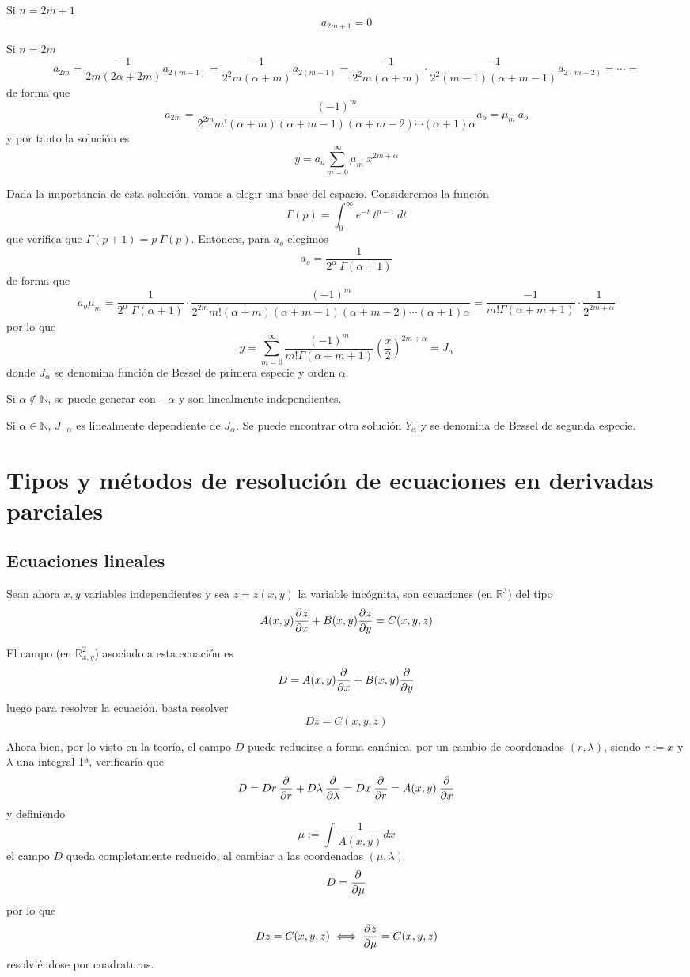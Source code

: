 \begin{eje}
    Si $n=2m+1$
$$a_{2m+1}=0$$
    
    Si $n=2m$
    $$a_{2m}=\dfrac{-1}{2m(2\alpha+2m)}a_{2(m-1)}=\dfrac{-1}{2^2m(\alpha+m)}a_{2(m-1)}=\dfrac{-1}{2^2m(\alpha+m)} \cdot \dfrac{-1}{2^2(m-1)(\alpha+m-1)}a_{2(m-2)}=\cdots=$$
    de forma que 
    $$a_{2m}=\dfrac{(-1)^m}{2^{2m} m! (\alpha+m) (\alpha+m-1) (\alpha+m-2) \cdots (\alpha+1)\alpha}a_o=\mu_m \: a_o$$
    y por tanto la solución es 
    $$\boxed{ \: y=a_o \sum_{m=0}^{\infty} \mu_m \: x^{2m+\alpha} \: }$$

    Dada la importancia de esta solución, vamos a elegir una base del espacio. Consideremos la función 
    $$\Gamma(p)=\int_0^{\infty}e^{-t} \: t^{p-1} \: dt$$
    que verifica que $\Gamma(p+1)=p \: \Gamma(p)$. Entonces, para $a_o$ elegimos
    $$a_o=\dfrac{1}{2^{\alpha} \: \Gamma(\alpha+1)} $$
    de forma que 
    $$a_o\mu_m=\dfrac{1}{2^{\alpha} \: \Gamma(\alpha+1)}  \cdot \dfrac{(-1)^m}{2^{2m} m! (\alpha+m) (\alpha+m-1) (\alpha+m-2) \cdots (\alpha+1)\alpha}=\dfrac{-1}{m! \Gamma(\alpha+m+1)} \cdot \dfrac{1}{2^{2m+\alpha}} $$
    por lo que 
    $$y=\sum_{m=0}^{\infty} \dfrac{(-1)^m}{m! \Gamma(\alpha+m+1)} \left(\dfrac{x}{2}\right)^{2m+\alpha}=J_{\alpha}$$
    donde $J_{\alpha}$ se denomina función de Bessel de primera especie y orden $\alpha$.

    Si $\alpha\nin \mathbb N$, se puede generar con $-\alpha$ y son linealmente independientes. 
    
    Si $\alpha\in \mathbb N$,  $J_{-\alpha}$ es linealmente dependiente de $J_{\alpha}$. Se puede encontrar otra solución $Y_{\alpha}$ y se denomina de Bessel de segunda especie.
\end{eje}
\chapter{Tipos y métodos de resolución de ecuaciones en derivadas parciales}
\section{Ecuaciones lineales}
Sean ahora $x,y$ variables independientes y sea $z=z(x,y)$ la variable incógnita, son ecuaciones (en $\mathbb R^3$) del tipo
$$A(x,y) \frac{\partial^{} z}{\partial x} + B(x,y) \frac{\partial^{} z}{\partial y}=C(x,y,z)$$

El campo (en $\mathbb R^2_{x,y}$) asociado a esta ecuación es 
$$D=A(x,y)\frac{\partial^{} }{\partial x}+B(x,y)\frac{\partial^{} }{\partial y}$$
luego para resolver la ecuación, basta resolver
$$Dz=C(x,y,z)$$

Ahora bien, por lo visto en la teoría, el campo $D$ puede reducirse a forma canónica, por un cambio de coordenadas $(r,\lambda)$, siendo $r:=x$ y $\lambda$ una integral 1ª, verificaría que
$$D=Dr \: \frac{\partial^{} }{\partial r}+ D\lambda \: \frac{\partial^{} }{\partial \lambda}=Dx \: \frac{\partial^{} }{\partial r}=A(x,y) \: \frac{\partial^{} }{\partial x}$$
y definiendo 
$$\mu:= \int \dfrac{1}{A(x,y)} dx$$
el campo $D$ queda completamente reducido, al cambiar a las coordenadas $(\mu, \lambda)$
$$D=\frac{\partial^{} }{\partial \mu}$$
por lo que 
$$Dz=C(x,y,z) \iff \frac{\partial^{} z}{\partial \mu}=C(x,y,z) $$
resolviéndose por cuadraturas.

